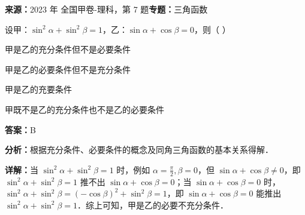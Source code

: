 \begin{question}[points=5]
\textbf{来源：}2023 年 全国甲卷-理科，第 7 题\quad \textbf{专题：}三角函数\par
设甲：$\sin^2 \alpha + \sin^2 \beta = 1$，乙：$\sin \alpha + \cos \beta = 0$，则（           ）
\begin{choices}
  \item 甲是乙的充分条件但不是必要条件
  \item 甲是乙的必要条件但不是充分条件
  \item 甲是乙的充要条件
  \item 甲既不是乙的充分条件也不是乙的必要条件
\end{choices}
\begin{solution}
\textbf{答案：}B

\textbf{分析：}根据充分条件、必要条件的概念及同角三角函数的基本关系得解．

\textbf{详解：}当 $\sin^2 \alpha + \sin^2 \beta = 1$ 时，例如 $\alpha = \frac{\pi}{2}, \beta = 0$，但 $\sin \alpha + \cos \beta \neq 0$，即 $\sin^2 \alpha + \sin^2 \beta = 1$ 推不出 $\sin \alpha + \cos \beta = 0$；当 $\sin \alpha + \cos \beta = 0$ 时，$\sin^2 \alpha + \sin^2 \beta = (-\cos \beta)^2 + \sin^2 \beta = 1$，即 $\sin \alpha + \cos \beta = 0$ 能推出 $\sin^2 \alpha + \sin^2 \beta = 1$．综上可知，甲是乙的必要不充分条件．
\end{solution}
\end{question}

